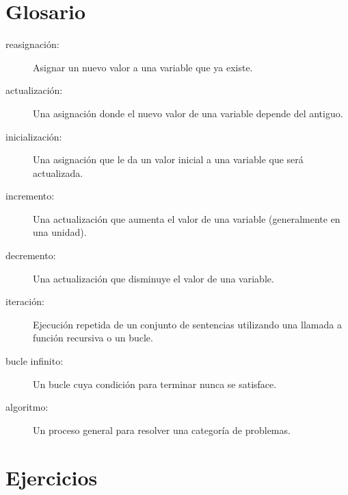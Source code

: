 \documentclass[10pt]{book}
\begin{document}
\section{Glosario}

\begin{description}

\item[reasignación:] Asignar un nuevo valor a una variable que
ya existe.

\item[actualización:] Una asignación donde el nuevo valor de una variable
depende del antiguo.

\item[inicialización:] Una asignación que le da un valor inicial a
una variable que será actualizada.

\item[incremento:] Una actualización que aumenta el valor de una variable
(generalmente en una unidad).

\item[decremento:] Una actualización que disminuye el valor de una variable.

\item[iteración:] Ejecución repetida de un conjunto de sentencias utilizando
una llamada a función recursiva o un bucle.

\item[bucle infinito:] Un bucle cuya condición para terminar nunca
se satisface.

\item[algoritmo:]  Un proceso general para resolver una categoría de
problemas.

\end{description}


\section{Ejercicios}
\end{document}
